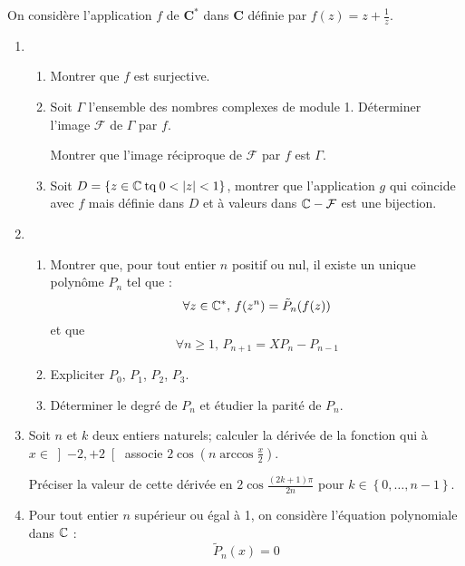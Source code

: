 On consid{\`e}re l'application $f$ de $\mathbf{C}^{*}$ dans $\mathbf{C}$ d{\'e}finie par $f(z)=z+\frac{1}{z}$.

\begin{enumerate}
\item
\begin{enumerate}
\item  Montrer que $f$ est surjective.

\item  Soit $\Gamma $ l'ensemble des nombres complexes de module 1. D{\'e}terminer l'image $\mathcal{F}$ de $\Gamma $ par $f$.

Montrer que l'image r{\'e}ciproque de $\mathcal{F}$ par $f$ est $\Gamma $.

\item  Soit $D=\left\{ z\in \Bbb{C}\:\mathrm{ tq }\:0<\left| z\right|<1\right\} $, montrer que l'application $g$ qui co{\"\i}ncide avec $f$ mais d{\'e}finie dans $D$ et {\`a} valeurs dans $\Bbb{C}-\mathcal{F}$ est une bijection.
\end{enumerate}

\item
\begin{enumerate}
\item  Montrer que, pour tout entier $n$ positif ou nul, il existe un unique polyn{\^o}me $P_{n}$ tel que :
$$\forall z \in \Bbb{C}^{*},\, f(z^{n})=\tilde{P}_{n}(f(z))$$ et que
$$\forall n \geq 1 ,\, P_{n+1}=XP_{n}-P_{n-1}$$
\item  Expliciter $P_{0}$, $P_{1}$, $P_{2}$, $P_{3}$.

\item  D{\'e}terminer le degr{\'e} de $P_{n}$ et {\'e}tudier la parit{\'e}
de $P_{n}$.
\end{enumerate}

\item  Soit $n$ et $k$ deux entiers naturels; calculer la d{\'e}riv{\'e}e de la fonction qui {\`a} $x\in \left] -2,+2\right[ $ associe $2\cos (n\arccos \frac{x}{2})$.

Pr{\'e}ciser la valeur de cette d{\'e}riv{\'e}e en $2\cos \frac{(2k+1)\pi }{2n}$ pour $k\in \left\{ 0,\ldots ,n-1\right\} $.

\item  Pour tout entier $n$ sup{\'e}rieur ou {\'e}gal {\`a} 1, on
consid{\`e}re l'{\'e}quation polynomiale dans $\Bbb{C}$ :
\begin{equation}
\tilde{P}_{n}(x)=0
\end{equation}


\end{enumerate}
